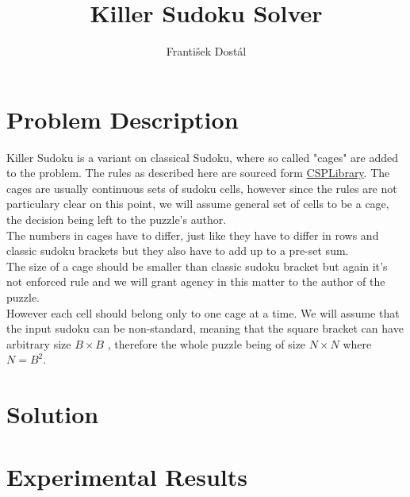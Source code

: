 \documentclass[10pt,a4paper,oneside]{article}
\author{František Dostál}
\title{Killer Sudoku Solver}
\begin{document}
\maketitle
\section{Problem Description}
Killer Sudoku is a variant on classical Sudoku, where so called "cages" are added to the problem. The rules as described here are sourced form \href{https://www.csplib.org/Problems/prob057/}{CSPLibrary}.
The cages are usually continuous sets of sudoku cells, however since the rules are not particulary clear on this point, we will assume general set of cells to be a cage, the decision being left to the puzzle's author.\\
The numbers in cages have to differ, just like they have to differ in rows and classic sudoku brackets but they also have to add up to a pre-set sum.\\
The size of a cage should be smaller than classic sudoku bracket but again it's not enforced rule and we will grant agency in this matter to the author of the puzzle.\\
However each cell should belong only to one cage at a time.
We will assume that the input sudoku can be non-standard, meaning that the square bracket can have arbitrary size $ B\times B$ , therefore the whole puzzle being of size $ N\times N$ where $ N = B^{2} $. 

\section{Solution}
\section{Experimental Results}
\end{document}
